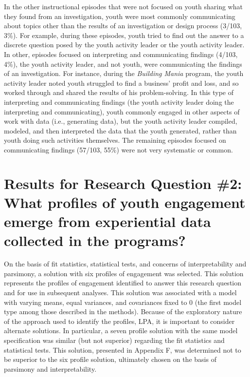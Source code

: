 \documentclass[]{book}
\theoremstyle{definition}
\theoremstyle{definition}
\theoremstyle{definition}
\theoremstyle{remark}
\begin{document}
In the other instructional episodes that were not focused on youth
sharing what they found from an investigation, youth were most commonly
communicating about topics other than the results of an investigation or
design process (3/103, 3\%). For example, during these episodes, youth
tried to find out the answer to a discrete question posed by the youth
activity leader or the youth activity leader. In other, episodes focused
on interpreting and communicating findings (4/103, 4\%), the youth
activity leader, and not youth, were communicating the findings of an
investigation. For instance, during the \emph{Building Mania} program,
the youth activity leader noted youth struggled to find a business'
profit and loss, and so worked through and shared the results of his
problem-solving. In this type of interpreting and communicating findings
(the youth activity leader doing the interpreting and communicating),
youth commonly engaged in other aspects of work with data (i.e.,
generating data), but the youth activity leader compiled, modeled, and
then interpreted the data that the youth generated, rather than youth
doing such activities themselves. The remaining episodes focused on
communicating findings (57/103, 55\%) were not very systematic or
common.

\section{Results for Research Question \#2: What profiles of youth
engagement emerge from experiential data collected in the
programs?}\label{results-for-research-question-2-what-profiles-of-youth-engagement-emerge-from-experiential-data-collected-in-the-programs}

On the basis of fit statistics, statistical tests, and concerns of
interpretability and parsimony, a solution with six profiles of
engagement was selected. This solution represents the profiles of
engagement identified to answer this research question and for use in
subsequent analyses. This solution was associated with a model with
varying means, equal variances, and covariances fixed to 0 (the first
model type among those described in the methods). Because of the
exploratory nature of the approach used to identify the profiles, LPA,
it is important to consider alternate solutions. In particular, a seven
profile solution with the same model specification was similar (but not
superior) regarding the fit statistics and statistical tests. This
solution, presented in Appendix F, was determined not to be superior to
the six profile solution, ultimately chosen on the basis of parsimony
and interpretability.
\end{document}
